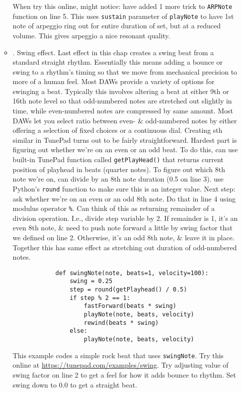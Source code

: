 \documentclass{article}
\begin{document}
\begin{itemize}
\begin{itemize}
		When try this online, might notice: have added 1 more trick to {\tt ARPNote} function on line 5. This uses {\tt sustain} parameter of {\tt playNote} to have 1st note of arpeggio ring out for entire duration of set, but at a reduced volume. This gives arpeggio a nice resonant quality.
		\item {. Swing effect.} Last effect in this chap creates a swing beat from a standard straight rhythm. Essentially this means adding a bounce or swing to a rhythm's timing so that we move from mechanical precision to more of a human feel. Most DAWs provide a variety of options for swinging a beat. Typically this involves altering a beat at either 9th or 16th note level so that odd-numbered notes are stretched out slightly in time, while even-numbered notes are compressed by same amount. Most DAWs let you select ratio between even- \& odd-numbered notes by either offering a selection of fixed choices or a continuous dial. Creating sth similar in TunePad turns out to be fairly straightforward. Hardest part is figuring out whether we're on an even or an odd beat. To do this, can use built-in TunePad function called {\tt getPlayHead()} that returns current position of playhead in beats (quarter notes). To figure out which 8th note we're on, can divide by an 8th note duration (0.5 on line 3). use Python's {\tt round} function to make sure this is an integer value. Next step: ask whether we're on an even or an odd 8th note. Do that in line 4 using modulus operator {\tt\%}. Can think of this as returning remainder of a division operation. I.e., divide step variable by 2. If remainder is 1, it's an even 8th note, \& need to push note forward a little by swing factor that we defined on line 2. Otherwise, it's an odd 8th note, \& leave it in place. Together this has same effect as stretching out duration of odd-numbered notes.
		\begin{verbatim}
			def swingNote(note, beats=1, velocity=100):
			    swing = 0.25
			    step = round(getPlayhead() / 0.5)
			    if step % 2 == 1:
			        fastForward(beats * swing)
			        playNote(note, beats, velocity)
			        rewind(beats * swing)
			    else:
			        playNote(note, beats, velocity)
		\end{verbatim}
		This example codes a simple rock beat that uses {\tt swingNote}. Try this online at \url{https://tunepad.com/examples/swing}. Try adjusting value of swing factor on line 2 to get a feel for how it adds bounce to rhythm. Set swing down to 0.0 to get a straight beat.
	\end{itemize}

\end{itemize}
\end{document}
